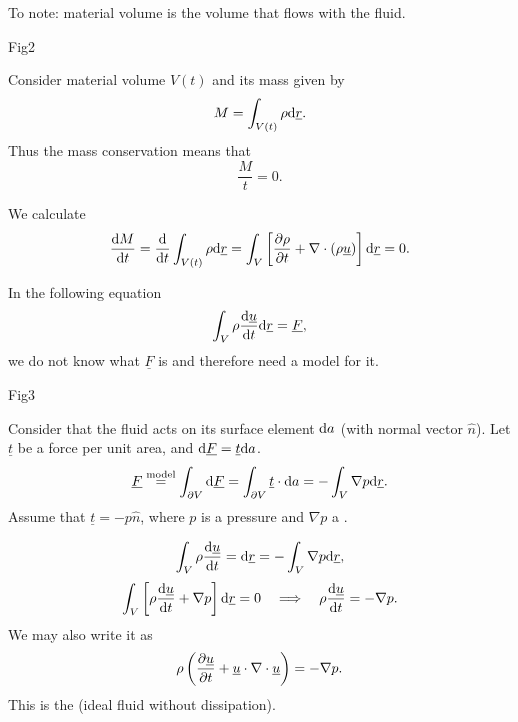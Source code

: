 \documentclass[11pt,oneside]{book}
\renewcommand{\vec}[1]{\underline{#1}}
\theoremstyle{definition} %
\theoremstyle{plain} %
\theoremstyle{remark} %
\theoremstyle{underline}
\begin{document}
  To note: material volume is the volume that flows with the fluid.
  
  \todo Fig2

  Consider material volume $V(t)$ and its mass given by
  \begin{displaymath}
    M = \int_{V(t)}  \rho \d \vec r.
  \end{displaymath}
  Thus the mass conservation means that
  \begin{displaymath}
    \dfrac{M}{t} = 0.
  \end{displaymath}

  We calculate
  \begin{displaymath}
    \dfrac{M}{t} = \dfrac{}{t} \int_{V(t)} \rho \d \vec r 
    = \int_V \left[ \ptf{\rho}{t} + \nabla \cdot (\rho \vec u) \right]\d \vec r 
    = 0.
  \end{displaymath}
  
  In the following equation
  \begin{displaymath}
    \int_V \rho \dfrac{\vec u}{t} \d \vec r = \vec F,
  \end{displaymath}
  we do not know what $\vec F$ is and therefore need a model for it.

  \todo Fig3

  Consider that the fluid acts on its surface element $\mathrm{d} a$ (with normal vector $\hat n$).
  Let $\vec t$ be a force per unit area, and $\d \vec F = \vec t \d a$.
  \begin{displaymath}
    \vec F \os{\tm{model}}{=} \int_{\partial V} \d \vec F 
    = \int_{\partial V}  \vec t \cdot \d a
    = - \int_V \nabla p \d \vec r.
  \end{displaymath}
  Assume that $\vec t = - p \hat{n}$, where $p $ is a pressure and $\nabla p $ a .
  
  \begin{displaymath}
    \int_V \rho \dfrac{\vec u }{t} = \d \vec r = - \int_V \nabla p \d \vec r,
  \end{displaymath}
  \begin{displaymath}
    \int_V \left[ \rho \dfrac{\vec u}{t} + \nabla p \right]\d \vec r = 0 
    \qLRa \rho \dfrac{ \vec u }{t} = - \nabla p.
  \end{displaymath}
  We may also write it as 
  \begin{displaymath}
    \rho \left( \ptf{\vec u}{t} + \vec u \cdot \nabla \cdot \vec u  \right) = - \nabla p.
  \end{displaymath}
  This is the  (ideal fluid without dissipation).
  
\end{document}
